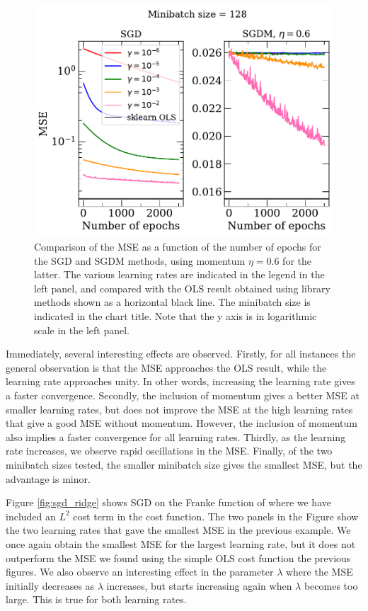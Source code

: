 \documentclass[a4paper,
amsfonts,
amssymb,
amsmath,
reprint,
showkeys,
nofootinbib,
twoside]{revtex4-2}
\begin{document}
\begin{figure} [h]
    \centering
    \includegraphics[width = \columnwidth]{Figures/sgd_2.pdf}
    \caption{Comparison of the MSE as a function of the number of epochs for the SGD and SGDM methods, using momentum $\eta = 0.6$ for the latter. The various learning rates are indicated in the legend in the left panel, and compared with the OLS result obtained using library methods shown as a horizontal black line. The minibatch size is indicated in the chart title. Note that the y axis is in logarithmic scale in the left panel.}
    \label{fig:sgd_2}
\end{figure}

Immediately, several interesting effects are observed. Firstly, for all instances the general observation is that the MSE approaches the OLS result, while the learning rate approaches unity. In other words, increasing the learning rate gives a faster convergence. Secondly, the inclusion of momentum gives a better MSE at smaller learning rates, but does not improve the MSE at the high learning rates that give a good MSE without momentum. However, the inclusion of momentum also implies a faster convergence for all learning rates. Thirdly, as the learning rate increases, we observe rapid oscillations in the MSE. Finally, of the two minibatch sizes tested, the smaller minibatch size gives the smallest MSE, but the advantage is minor.

Figure \ref{fig:sgd_ridge} shows SGD on the Franke function of where we have included an $L^2$ cost term in the cost function. The two panels in the Figure show the two learning rates that gave the smallest MSE in the previous example. We once again obtain the smallest MSE for the largest learning rate, but it does not outperform the MSE we found using the simple OLS cost function the previous figures. We also observe an interesting effect in the parameter $\lambda$ where the MSE initially decreases as $\lambda$ increases, but starts increasing again when $\lambda$ becomes too large. This is true for both learning rates.
\end{document}
